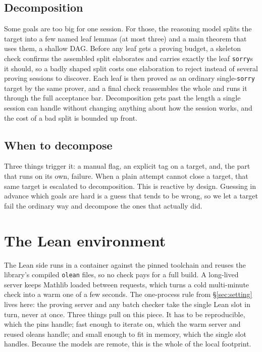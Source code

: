 \documentclass[11pt]{article}
\newcommand{\lean}[1]{\texttt{\def\_{\textunderscore\allowbreak}#1}}
\begin{document}
\subsection{Decomposition}
Some goals are too big for one session. For those, the reasoning model splits the target
into a few named leaf lemmas (at most three) and a main theorem that uses them, a shallow
DAG. Before any leaf gets a proving budget, a skeleton check confirms the assembled split
elaborates and carries exactly the leaf \lean{sorry}s it should, so a badly shaped split
costs one elaboration to reject instead of several proving sessions to discover. Each leaf
is then proved as an ordinary single-\lean{sorry} target by the same prover, and a final
check reassembles the whole and runs it through the full acceptance bar. Decomposition
gets past the length a single session can handle without changing anything about how the
session works, and the cost of a bad split is bounded up front.

\subsection{When to decompose}
Three things trigger it: a manual flag, an explicit tag on a target, and, the part that
runs on its own, failure. When a plain attempt cannot close a target, that same target is
escalated to decomposition. This is reactive by design. Guessing in advance which goals
are hard is a guess that tends to be wrong, so we let a target fail the ordinary way and
decompose the ones that actually did.

\section{The Lean environment}\label{sec:env}

The Lean side runs in a container against the pinned toolchain and reuses the library's
compiled \lean{olean} files, so no check pays for a full build. A long-lived server keeps
Mathlib loaded between requests, which turns a cold multi-minute check into a warm one of
a few seconds. The one-process rule from \S\ref{sec:setting} lives here: the proving
server and any batch checker take the single Lean slot in turn, never at once. Three
things pull on this piece. It has to be reproducible, which the pins handle; fast enough
to iterate on, which the warm server and reused oleans handle; and small enough to fit in
memory, which the single slot handles. Because the models are remote, this is the whole
of the local footprint.
\end{document}
